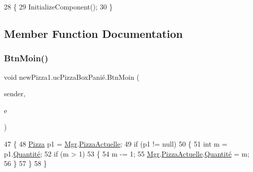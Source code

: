 \begin{DoxyCode}
28         \{
29             InitializeComponent();
30         \}
\end{DoxyCode}


\subsection{Member Function Documentation}
\mbox{\label{classnewPizza1_1_1ucPizzaBoxPani_xC3_xA9_a5f8f130d8d24722e0fde22297193e9e0}} 
\subsubsection{\texorpdfstring{Btn\+Moin()}{BtnMoin()}}
{\footnotesize\ttfamily void new\+Pizza1.\+uc\+Pizza\+Box\+Panié.\+Btn\+Moin (\begin{DoxyParamCaption}\item[{object}]{sender,  }\item[{Routed\+Event\+Args}]{e }\end{DoxyParamCaption})\hspace{0.3cm}{\ttfamily [inline]}}


\begin{DoxyCode}
47         \{
48             \hyperlink{classModele_1_1Pizza}{Pizza} p1 = \hyperlink{classnewPizza1_1_1ucPizzaBoxPani_xC3_xA9_a8bf5e4ad9d5295a1d0b9ea6274f7d13f}{Mgr}.\hyperlink{classModele_1_1Manager_a7e69844aeeebbc80144850efc0d2b94c}{PizzaActuelle};
49             \textcolor{keywordflow}{if} (p1 != null)
50             \{
51                 \textcolor{keywordtype}{int} m = p1.\hyperlink{classModele_1_1Pizza_ae755ca79feb6f9a522aa18544c3f1310}{Quantité};
52                 \textcolor{keywordflow}{if} (m > 1)
53                 \{
54                     m -= 1;
55                     \hyperlink{classnewPizza1_1_1ucPizzaBoxPani_xC3_xA9_a8bf5e4ad9d5295a1d0b9ea6274f7d13f}{Mgr}.\hyperlink{classModele_1_1Manager_a7e69844aeeebbc80144850efc0d2b94c}{PizzaActuelle}.\hyperlink{classModele_1_1Pizza_ae755ca79feb6f9a522aa18544c3f1310}{Quantité} = m;
56                 \}
57             \}
58         \}
\end{DoxyCode}
\mbox{\label{classnewPizza1_1_1ucPizzaBoxPani_xC3_xA9_a6c68f66117ab0bfb69dd27f8e3972b34}} 
